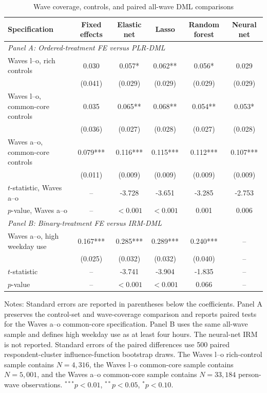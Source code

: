 \begin{table}[!htbp]
\centering
\caption{Wave coverage, controls, and paired all-wave DML comparisons}
\label{tab:robustness_extended_waves}
\small
\setlength{\tabcolsep}{5pt}
\begin{tabular*}{\textwidth}{@{\extracolsep{\fill}}lccccc}
\hline
Specification & Fixed effects & Elastic net & Lasso & Random forest & Neural net
\\
\hline
\multicolumn{6}{l}{\textit{Panel A: Ordered-treatment FE versus PLR-DML}} \\
Waves l--o, rich controls & 0.030 & 0.057* & 0.062** & 0.056* & 0.029
\\
 & (0.041) & (0.029) & (0.029) & (0.029) & (0.029)
\\
Waves l--o, common-core controls & 0.035 & 0.065** & 0.068** & 0.054** & 0.053*
\\
 & (0.036) & (0.027) & (0.028) & (0.027) & (0.028)
\\
Waves a--o, common-core controls & 0.079*** & 0.116*** & 0.115*** & 0.112*** & 0.107***
\\
 & (0.011) & (0.009) & (0.009) & (0.009) & (0.009)
\\
$t$-statistic, Waves a--o & -- & -3.728 & -3.651 & -3.285 & -2.753
\\
$p$-value, Waves a--o & -- & $<0.001$ & $<0.001$ & 0.001 & 0.006
\\[0.5ex]
\multicolumn{6}{l}{\textit{Panel B: Binary-treatment FE versus IRM-DML}} \\
Waves a--o, high weekday use & 0.167*** & 0.285*** & 0.289*** & 0.240*** & --
\\
 & (0.025) & (0.032) & (0.032) & (0.040) & --
\\
$t$-statistic & -- & -3.741 & -3.904 & -1.835 & --
\\
$p$-value & -- & $<0.001$ & $<0.001$ & 0.066 & --
\\
\hline
\end{tabular*}
\begin{minipage}{0.97\textwidth}
\footnotesize Notes: Standard errors are reported in parentheses below the coefficients. Panel A preserves the control-set and wave-coverage comparison and reports paired tests for the Waves a--o common-core specification. Panel B uses the same all-wave sample and defines high weekday use as at least four hours. The neural-net IRM is not reported. Standard errors of the paired differences use 500 paired respondent-cluster influence-function bootstrap draws. The Waves l--o rich-control sample contains $N=4,316$, the Waves l--o common-core sample contains $N=5,001$, and the Waves a--o common-core sample contains $N=33,184$ person-wave observations. $^{***}p<0.01$, $^{**}p<0.05$, $^{*}p<0.10$.
\end{minipage}
\end{table}
